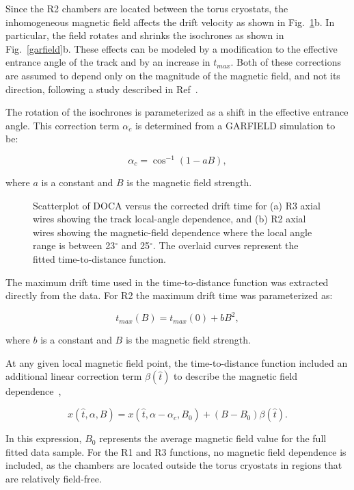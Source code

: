 Since the R2 chambers are located between the torus cryostats, the 
inhomogeneous magnetic field affects the drift velocity as shown in 
Fig.~\ref{xvst}b.  In particular, the field rotates and shrinks the isochrones
as shown in Fig.~\ref{garfield}b.  These effects can be modeled by a 
modification to the effective entrance angle of the track and by an increase 
in $t_{max}$.  Both of these corrections are assumed to depend only on the 
magnitude of the magnetic field, and not its direction, following a study 
described in Ref~\cite{MM-IEEE}.  

The rotation of the isochrones is parameterized as a shift in the effective
entrance angle.  This correction term $\alpha_c$ is determined from a 
GARFIELD simulation to be:

\begin{equation} 
\label{eq-bang}
\alpha_c = \cos^{-1}(1 - a B), 
\end{equation}

\noindent
where $a$ is a constant and $B$ is the magnetic field strength.

\begin{figure}[htpb]
\vspace{9.8cm} 
\caption{\small{Scatterplot of DOCA versus the corrected drift time for (a) R3
axial wires showing the track local-angle dependence, and (b) R2 axial wires
showing the magnetic-field dependence where the local angle range is between 
23$^{\circ}$ and 25$^{\circ}$.  The overlaid curves represent the fitted 
time-to-distance function.}}
\label{xvst}
\end{figure}


The maximum drift time used in the time-to-distance function was extracted 
directly from the data.  For R2 the maximum drift time was parameterized as:

\begin{equation} 
\label{eq-bmax}
t_{max}(B) = t_{max}(0) + b B^2,
\end{equation}

\noindent
where $b$ is a constant and $B$ is the magnetic field strength.

At any given local magnetic field point, the time-to-distance function 
included an additional linear correction term $\beta(\hat{t})$ to describe 
the magnetic field dependence~\cite{qin96}, 

\begin{equation}
\label{XTB}
x(\hat{t},\alpha,B) = x(\hat{t},\alpha-\alpha_c,B_0) + (B-B_0) \beta(\hat{t}).
\end{equation}

\noindent
In this expression, $B_0$ represents the average magnetic field value for the 
full fitted data sample.  For the R1 and R3 functions, no magnetic field 
dependence is included, as the chambers are located outside the torus 
cryostats in regions that are relatively field-free.


